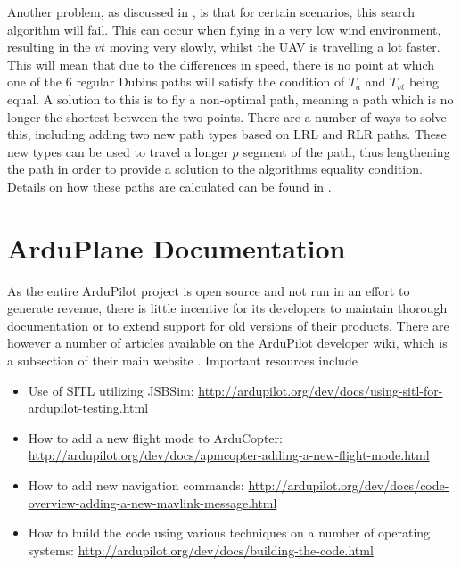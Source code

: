 Another problem, as discussed in \cite{mcgee2005optimal}, is that for certain scenarios, this search algorithm will fail. This can occur when flying in a very low wind environment, resulting in the $vt$ moving very slowly, whilst the UAV is travelling a lot faster. This will mean that due to the differences in speed, there is no point at which one of the 6 regular Dubins paths will satisfy the condition of $T_a$ and $T_{vt}$ being equal. A solution to this is to fly a non-optimal path, meaning a path which is no longer the shortest between the two points. There are a number of ways to solve this, including adding two new path types based on LRL and RLR paths. These new types can be used to travel a longer $p$ segment of the path, thus lengthening the path in order to provide a solution to the algorithms equality condition. Details on how these paths are calculated can be found in \cite{mcgee2005optimal}. %


\section{ArduPlane Documentation}
\label{litrev:arduplane}

As the entire ArduPilot project is open source and not run in an effort to generate revenue, there is little incentive for its developers to maintain thorough documentation or to extend support for old versions of their products. There are however a number of articles available on the ArduPilot developer wiki, which is a subsection of their main website \cite{ArduPilotDev}. Important resources include
\begin{itemize}
  	\item Use of SITL utilizing JSBSim: \url{http://ardupilot.org/dev/docs/using-sitl-for-ardupilot-testing.html}
  	\item How to add a new flight mode to ArduCopter: \url{http://ardupilot.org/dev/docs/apmcopter-adding-a-new-flight-mode.html}
  	\item How to add new navigation commands: \url{http://ardupilot.org/dev/docs/code-overview-adding-a-new-mavlink-message.html}
  	\item How to build the code using various techniques on a number of operating systems: \url{http://ardupilot.org/dev/docs/building-the-code.html}
  \end{itemize}  

